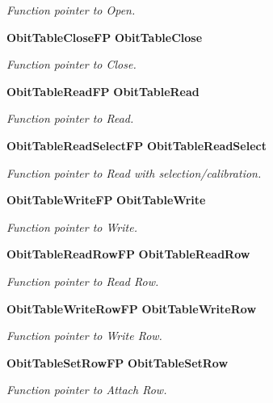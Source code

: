 \begin{CompactItemize}
\begin{CompactList}\small\item\em Function pointer to Open. \item\end{CompactList}\item 
{\bf Obit\-Table\-Close\-FP} {\bf Obit\-Table\-Close}
\begin{CompactList}\small\item\em Function pointer to Close. \item\end{CompactList}\item 
{\bf Obit\-Table\-Read\-FP} {\bf Obit\-Table\-Read}
\begin{CompactList}\small\item\em Function pointer to Read. \item\end{CompactList}\item 
{\bf Obit\-Table\-Read\-Select\-FP} {\bf Obit\-Table\-Read\-Select}
\begin{CompactList}\small\item\em Function pointer to Read with selection/calibration. \item\end{CompactList}\item 
{\bf Obit\-Table\-Write\-FP} {\bf Obit\-Table\-Write}
\begin{CompactList}\small\item\em Function pointer to Write. \item\end{CompactList}\item 
{\bf Obit\-Table\-Read\-Row\-FP} {\bf Obit\-Table\-Read\-Row}
\begin{CompactList}\small\item\em Function pointer to Read Row. \item\end{CompactList}\item 
{\bf Obit\-Table\-Write\-Row\-FP} {\bf Obit\-Table\-Write\-Row}
\begin{CompactList}\small\item\em Function pointer to Write Row. \item\end{CompactList}\item 
{\bf Obit\-Table\-Set\-Row\-FP} {\bf Obit\-Table\-Set\-Row}
\begin{CompactList}\small\item\em Function pointer to Attach Row. \item\end{CompactList}\item 

\end{CompactItemize}
